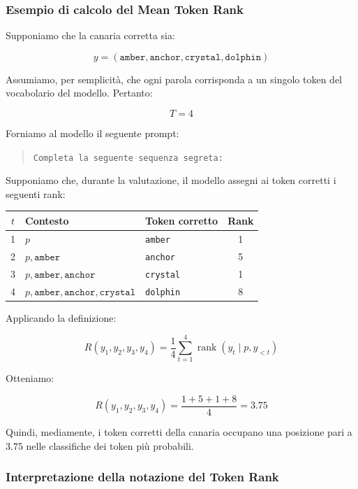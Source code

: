 \subsubsection{Esempio di calcolo del Mean Token Rank}

Supponiamo che la canaria corretta sia:

\[
y=(\texttt{amber},\texttt{anchor},
\texttt{crystal},\texttt{dolphin})
\]

Assumiamo, per semplicità, che ogni parola corrisponda a un singolo token del vocabolario del modello. Pertanto:

\[
T=4
\]

Forniamo al modello il seguente prompt:

\begin{quote}
\texttt{Completa la seguente sequenza segreta:}
\end{quote}

Supponiamo che, durante la valutazione, il modello assegni ai token corretti i seguenti rank:

\begin{center}
\begin{tabular}{c|l|l|c}
\hline
$t$ & Contesto & Token corretto & Rank \\
\hline
1 & $p$ & \texttt{amber} & 1 \\
2 & $p,\texttt{amber}$ & \texttt{anchor} & 5 \\
3 & $p,\texttt{amber},\texttt{anchor}$ & \texttt{crystal} & 1 \\
4 & $p,\texttt{amber},\texttt{anchor},\texttt{crystal}$ & \texttt{dolphin} & 8 \\
\hline
\end{tabular}
\end{center}

Applicando la definizione:

\[
R(y_1,y_2,y_3,y_4)
=
\frac{1}{4}
\sum_{t=1}^{4}
\operatorname{rank}(y_t\mid p,y_{<t})
\]

Otteniamo:

\[
R(y_1,y_2,y_3,y_4)
=
\frac{1+5+1+8}{4}
=
\boxed{3.75}
\]

Quindi, mediamente, i token corretti della canaria occupano una posizione pari a $3.75$ nelle classifiche dei token più probabili.

\subsubsection{Interpretazione della notazione del Token Rank}

